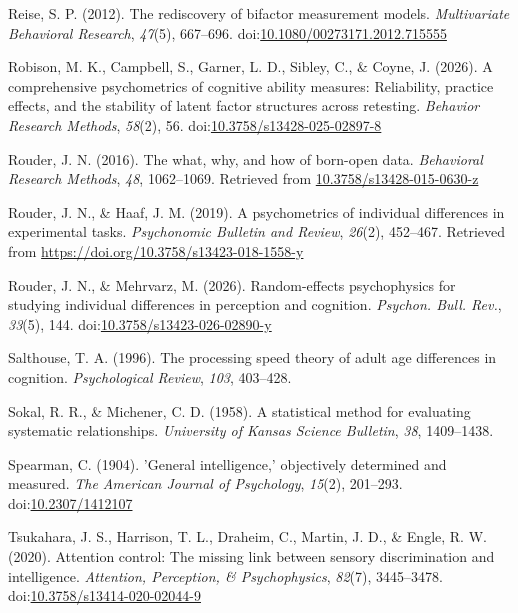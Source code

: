\documentclass[
  ,man]{apa6}
\newlength{\cslhangindent}
\newenvironment{CSLReferences}[2] %
 {\begin{list}{}{%
  \setlength{\itemindent}{0pt}
  \setlength{\leftmargin}{0pt}
  \setlength{\parsep}{0pt}
  \ifodd #1
   \setlength{\leftmargin}{\cslhangindent}
   \setlength{\itemindent}{-1\cslhangindent}
  \fi
  \setlength{\itemsep}{#2\baselineskip}}}
 {\end{list}}
\begin{document}
\begin{CSLReferences}{1}{0}
Reise, S. P. (2012). The rediscovery of bifactor measurement models. \emph{Multivariate Behavioral Research}, \emph{47}(5), 667--696. doi:\href{https://doi.org/10.1080/00273171.2012.715555}{10.1080/00273171.2012.715555}

Robison, M. K., Campbell, S., Garner, L. D., Sibley, C., \& Coyne, J. (2026). A comprehensive psychometrics of cognitive ability measures: {Reliability}, practice effects, and the stability of latent factor structures across retesting. \emph{Behavior Research Methods}, \emph{58}(2), 56. doi:\href{https://doi.org/10.3758/s13428-025-02897-8}{10.3758/s13428-025-02897-8}

Rouder, J. N. (2016). The what, why, and how of born-open data. \emph{Behavioral Research Methods}, \emph{48}, 1062--1069. Retrieved from \href{https://10.3758/s13428-015-0630-z}{10.3758/s13428-015-0630-z}

Rouder, J. N., \& Haaf, J. M. (2019). A psychometrics of individual differences in experimental tasks. \emph{Psychonomic Bulletin and Review}, \emph{26}(2), 452--467. Retrieved from \url{https://doi.org/10.3758/s13423-018-1558-y}

Rouder, J. N., \& Mehrvarz, M. (2026). Random-effects psychophysics for studying individual differences in perception and cognition. \emph{Psychon. Bull. Rev.}, \emph{33}(5), 144. doi:\href{https://doi.org/10.3758/s13423-026-02890-y}{10.3758/s13423-026-02890-y}

Salthouse, T. A. (1996). The processing speed theory of adult age differences in cognition. \emph{Psychological Review}, \emph{103}, 403--428.

Sokal, R. R., \& Michener, C. D. (1958). A statistical method for evaluating systematic relationships. \emph{University of Kansas Science Bulletin}, \emph{38}, 1409--1438.

Spearman, C. (1904). '{General} intelligence,' objectively determined and measured. \emph{The American Journal of Psychology}, \emph{15}(2), 201--293. doi:\href{https://doi.org/10.2307/1412107}{10.2307/1412107}

Tsukahara, J. S., Harrison, T. L., Draheim, C., Martin, J. D., \& Engle, R. W. (2020). Attention control: {The} missing link between sensory discrimination and intelligence. \emph{Attention, Perception, \& Psychophysics}, \emph{82}(7), 3445--3478. doi:\href{https://doi.org/10.3758/s13414-020-02044-9}{10.3758/s13414-020-02044-9}


\end{CSLReferences}
\end{document}
